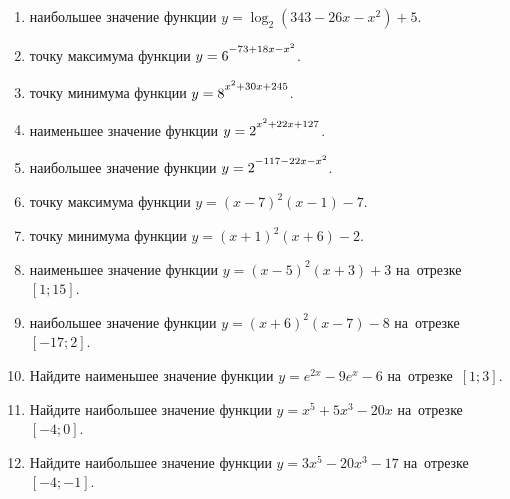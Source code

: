 \documentclass[a4paper,10pt]{article}
\begin{document}
\begin{enumerate}
\item {} наибольшее значение функции $y=\log_2\left(343-26x-x^2\right)+5$.

\item {} точку максимума функции $y=6\strut^{-73+18x-x^2}$.

\item {} точку минимума функции $y=8\strut^{x^2+30x+245}$.

\item {} наименьшее значение функции $y=2\strut^{x^2+22x+127}$.

\item {} наибольшее значение функции $y=2\strut^{-117-22x-x^2}$.

\item {} точку максимума функции $y=\left(x-7\right)^2\left(x-1\right)-7$.

\item {} точку минимума функции $y=\left(x+1\right)^2\left(x+6\right)-2$.

\item {} наименьшее значение функции $y=\left(x-5\right)^2\left(x+3\right)+3$ на~отрезке~$\left[1;15\right]$.

\item {} наибольшее значение функции $y=\left(x+6\right)^2\left(x-7\right)-8$ на~отрезке~$\left[-17;2\right]$.

\item Найдите наименьшее значение функции $y=e^{2x}-9e^x-6$ на~отрезке~$\left[1;3\right]$.

\item Найдите наибольшее значение функции $y=x^5+5x^3-20x$ на~отрезке~$\left[-4;0\right]$.

\item Найдите наибольшее значение функции $y=3x^5-20x^3-17$ на~отрезке~$\left[-4;-1\right]$.

\end{enumerate}
\end{document}
